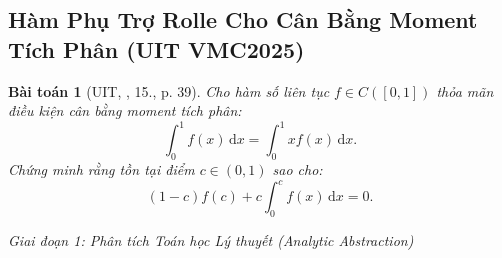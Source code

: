 \documentclass{article}
\newtheorem{baitoan}{Bài toán}
\begin{document}
\subsection{Hàm Phụ Trợ Rolle Cho Cân Bằng Moment Tích Phân (UIT VMC2025)}

\begin{baitoan}[UIT, \cite{VMS_VMC2025}, 15., p. 39]
Cho hàm số liên tục $f \in C([0, 1])$ thỏa mãn điều kiện cân bằng moment tích phân:
\begin{equation}
    \int_0^1 f(x) \, \mathrm{d}x = \int_0^1 x f(x) \, \mathrm{d}x.
\end{equation}
Chứng minh rằng tồn tại điểm $c \in (0, 1)$ sao cho:
\begin{equation}
    (1 - c) f(c) + c \int_0^c f(x) \, \mathrm{d}x = 0.
\end{equation}
\end{baitoan}

\vspace{0.5em}\noindent\emph{Giai đoạn 1: Phân tích Toán học Lý thuyết (Analytic Abstraction)}
\end{document}
